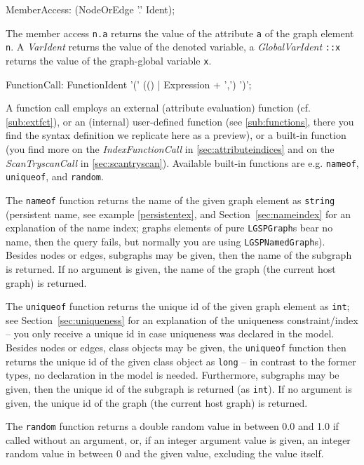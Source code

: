 \begin{rail}
  MemberAccess: (NodeOrEdge '.' Ident);
\end{rail}
The member access \texttt{n.a} returns the value of the attribute \texttt{a} of the graph element \texttt{n}.
A \emph{VarIdent} returns the value of the denoted variable, a \emph{GlobalVarIdent} \texttt{::x} returns the value of the graph-global variable \texttt{x}.

\begin{rail}
  FunctionCall: FunctionIdent '(' (() | Expression + ',') ')';
\end{rail}
A function call employs an external (attribute evaluation) function (cf. \ref{sub:extfct}), or an (internal) user-defined function (see \ref{sub:functions}, there you find the syntax definition we replicate here as a preview), or a built-in function (you find more on the \emph{IndexFunctionCall} in \ref{sec:attributeindices} and on the \emph{ScanTryscanCall} in \ref{sec:scantryscan}).
Available built-in functions are e.g. \texttt{nameof}, \texttt{uniqueof}, and \texttt{random}.

The \texttt{nameof} function returns the name of the given graph element as \texttt{string}
(persistent name, see example \ref{persistentex}, and Section~\ref{sec:nameindex} for an explanation of the name index; graphs elements of pure \texttt{LGSPGraph}s bear no name, then the query fails, but normally you are using \texttt{LGSPNamedGraph}s).
Besides nodes or edges, subgraphs may be given, then the name of the subgraph is returned.
If no argument is given, the name of the graph (the current host graph) is returned.

The \texttt{uniqueof} function returns the unique id of the given graph element as \texttt{int};
see Section~\ref{sec:uniqueness} for an explanation of the uniqueness constraint/index -- you only receive a unique id in case uniqueness was declared in the model.
Besides nodes or edges, class objects may be given, the \texttt{uniqueof} function then returns the unique id of the given class object as \texttt{long} -- in contrast to the former types, no declaration in the model is needed.
Furthermore, subgraphs may be given, then the unique id of the subgraph is returned (as \texttt{int}).
If no argument is given, the unique id of the graph (the current host graph) is returned.

The \texttt{random} function returns a double random value in between 0.0 and 1.0 if called without an argument,
or, if an integer argument value is given, an integer random value in between 0 and the given value, excluding the value itself.

